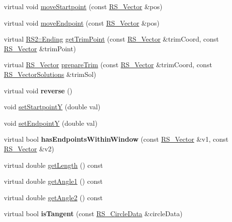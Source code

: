 \begin{DoxyCompactItemize}
\item 
virtual void \hyperlink{classRS__Line_a27b3c007264d52ad929a1c12cc3a7d4f}{move\-Startpoint} (const \hyperlink{classRS__Vector}{R\-S\-\_\-\-Vector} \&pos)
\item 
virtual void \hyperlink{classRS__Line_a7d8c2c02356f25540a5bed6acb7e0159}{move\-Endpoint} (const \hyperlink{classRS__Vector}{R\-S\-\_\-\-Vector} \&pos)
\item 
virtual \hyperlink{classRS2_a30e80df2ef4bb36f4e89ea500eb212ab}{R\-S2\-::\-Ending} \hyperlink{classRS__Line_a6fd8c941653787a7962bb40a066dd7db}{get\-Trim\-Point} (const \hyperlink{classRS__Vector}{R\-S\-\_\-\-Vector} \&trim\-Coord, const \hyperlink{classRS__Vector}{R\-S\-\_\-\-Vector} \&trim\-Point)
\item 
virtual \hyperlink{classRS__Vector}{R\-S\-\_\-\-Vector} \hyperlink{classRS__Line_aafdbed4b3551d313c01b20d8da8ccca0}{prepare\-Trim} (const \hyperlink{classRS__Vector}{R\-S\-\_\-\-Vector} \&trim\-Coord, const \hyperlink{classRS__VectorSolutions}{R\-S\-\_\-\-Vector\-Solutions} \&trim\-Sol)
\item 
\hypertarget{classRS__Line_aa55cc76659593c24f45ac96aa599bdc6}{virtual void {\bfseries reverse} ()}\label{classRS__Line_aa55cc76659593c24f45ac96aa599bdc6}

\item 
void \hyperlink{classRS__Line_ad9454f51be797d3355d6b8571a57c91b}{set\-Startpoint\-Y} (double val)
\item 
void \hyperlink{classRS__Line_ab1dc7594d46f0370b53139d44fcb7ff4}{set\-Endpoint\-Y} (double val)
\item 
\hypertarget{classRS__Line_a479ca0853836624727dd3309ab8effd9}{virtual bool {\bfseries has\-Endpoints\-Within\-Window} (const \hyperlink{classRS__Vector}{R\-S\-\_\-\-Vector} \&v1, const \hyperlink{classRS__Vector}{R\-S\-\_\-\-Vector} \&v2)}\label{classRS__Line_a479ca0853836624727dd3309ab8effd9}

\item 
virtual double \hyperlink{classRS__Line_ada81b0606ce0656051fe72fda978f5e0}{get\-Length} () const 
\item 
virtual double \hyperlink{classRS__Line_af0460342429b9f31badf079c125f57aa}{get\-Angle1} () const 
\item 
virtual double \hyperlink{classRS__Line_a44c9a9e9bec5a635983bd866ef05e19b}{get\-Angle2} () const 
\item 
\hypertarget{classRS__Line_a15933ccc3f05e838d16589a11963c372}{virtual bool {\bfseries is\-Tangent} (const \hyperlink{classRS__CircleData}{R\-S\-\_\-\-Circle\-Data} \&circle\-Data)}\label{classRS__Line_a15933ccc3f05e838d16589a11963c372}


\end{DoxyCompactItemize}
